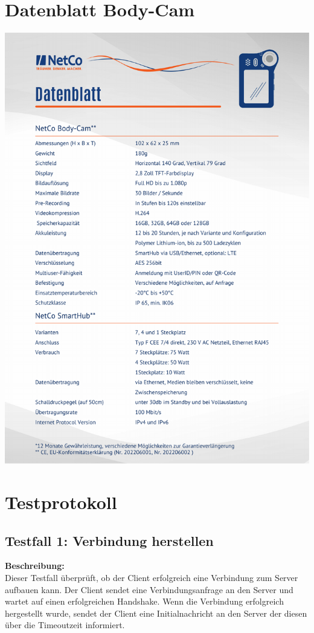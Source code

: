 \documentclass[thesis.tex]{subfiles}
\begin{document}
\section{Datenblatt Body-Cam}

\includegraphics[page=1,width=\textwidth,height=.9\textheight,keepaspectratio]{../sources/Datenblatt_Bodycam.pdf}

\section{Testprotokoll}

\subsection*{Testfall 1: Verbindung herstellen}

\textbf{Beschreibung:}\\
Dieser Testfall überprüft, ob der Client erfolgreich eine Verbindung zum Server aufbauen kann. Der Client sendet eine Verbindungsanfrage an den Server und wartet auf einen erfolgreichen Handshake. Wenn die Verbindung erfolgreich hergestellt wurde, sendet der Client eine Initialnachricht an den Server der diesen über die Timeoutzeit informiert.
\end{document}
